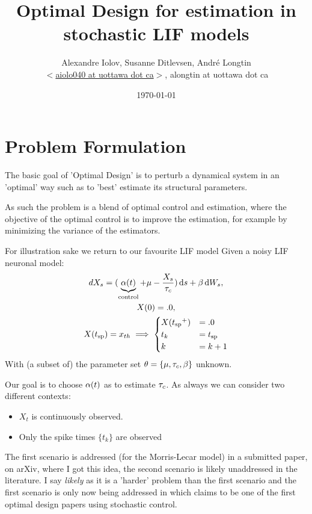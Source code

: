 \documentclass{article}
\begin{document}
\title{Optimal Design for estimation in stochastic LIF models} 
\author{Alexandre Iolov, Susanne Ditlevsen, Andr\'e Longtin  \\
$<$\href{mailto:aiolo040@uottawa.ca}
		{aiolo040 at uottawa dot ca}$>$, alongtin at uottawa dot ca}

\date{\today}

\maketitle


\tableofcontents

\section{Problem Formulation}
The basic goal of 'Optimal Design' is to perturb a dynamical system in an
'optimal' way such as to 'best' estimate its structural parameters. 

As such the problem is a blend of optimal control and estimation, where the
objective of the optimal control is to improve the estimation, for example by
minimizing the variance of the estimators. 

For illustration sake we return to our favourite LIF model
Given a noisy LIF neuronal model:
\begin{equation}
\begin{gathered}
dX_s = (\underbrace{\a(t)}_{\textrm{control}} + \m %
 - \frac{X_s}{\tc} ) \intd{s} + \b
\intd{W_s},
\\
X(0) = .0,
\\
X(\ts) = \xth \implies  
\begin{cases}
X(\ts^+) &= .0   
\\
t_k &=  \ts
\\
k  &= k+1
\end{cases}
\end{gathered}
\label{eq:X_evolution_uo}
\end{equation}
With (a subset of) the parameter set ${\theta} = \{{\mu }, { \tau_{c} }, {\beta}\}$ unknown.

Our goal is to choose ${\alpha}(t)$ as to estimate ${ \tau_{c} }$. As always we can
consider two different contexts:
\begin{itemize}
  \item $X_t$ is continuously observed. 
   \item Only the spike times $\{t_k\}$ are observed
\end{itemize}
The first scenario is addressed (for the Morris-Lecar model) in a submitted
paper, \cite{Lin} on arXiv, where I got this idea, the second scenario is likely
unaddressed in the literature. I say {\itshape likely} as it is a 'harder'
problem than the first scenario and the first scenario is only now being addressed in 
\cite{Lin} which claims to be one of the first optimal design papers using
stochastic control.
\end{document}
